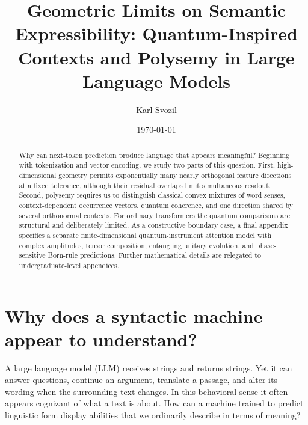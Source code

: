 \documentclass[
  aps,
  reprint,
  superscriptaddress,
  floatfix,
  nofootinbib,
  longbibliography
]{revtex4-2}
\begin{document}
\title{Geometric Limits on Semantic Expressibility: Quantum-Inspired Contexts and Polysemy in Large Language Models}

\author{Karl Svozil}

\date{\today}

\begin{abstract}
Why can next-token prediction produce language that appears meaningful?
Beginning with tokenization and vector encoding, we study two parts of this
question.  First, high-dimensional geometry permits exponentially many nearly
orthogonal feature directions at a fixed tolerance, although their residual
overlaps limit simultaneous readout.  Second, polysemy requires us to
distinguish classical convex mixtures of word senses, context-dependent
occurrence vectors, quantum coherence, and one direction shared by several
orthonormal contexts.  For ordinary transformers the quantum comparisons are
structural and deliberately limited.  As a constructive boundary case, a
final appendix specifies a separate finite-dimensional quantum-instrument
attention model
with complex amplitudes, tensor composition, entangling unitary evolution, and
phase-sensitive Born-rule predictions.  Further mathematical details are
relegated to undergraduate-level appendices.
\end{abstract}

\maketitle

\section{Why does a syntactic machine appear to understand?}
\label{sec:puzzle}

A large language model (LLM) receives strings and returns strings.  Yet it can
answer questions, continue an argument, translate a passage, and alter its
wording when the surrounding text changes.  In this behavioral sense it often
appears cognizant of what a text is about.  How can a machine trained to
predict linguistic form display abilities that we ordinarily describe in
terms of meaning?
\end{document}

